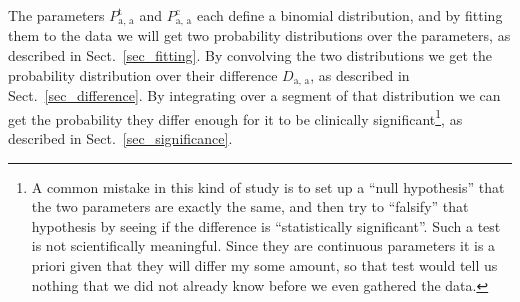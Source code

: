 \documentclass[10pt, twoside,a4paper]{article}
\begin{document}
The parameters $P^{\text{t}}_{\text{a, a}}$ and $P^{\text{c}}_{\text{a, a}}$ each define a binomial distribution, and by fitting them to the data we will get two probability distributions over the parameters, as described in Sect.~\ref{sec_fitting}. By convolving the two distributions we get the probability distribution over their difference $D_{\text{a, a}}$, as described in Sect.~\ref{sec_difference}. By integrating over a segment of that distribution we can get the probability they differ enough for it to be clinically significant\footnote{A common mistake in this kind of study is to set up a ``null hypothesis'' that the two parameters are exactly the same, and then try to ``falsify'' that hypothesis by seeing if the difference is ``statistically significant''. Such a test is not scientifically meaningful. Since they are continuous parameters it is a priori given that they will differ my some amount, so that test would tell us nothing that we did not already know before we even gathered the data.}, as described in Sect.~\ref{sec_significance}.
 
\newpage
\end{document}
